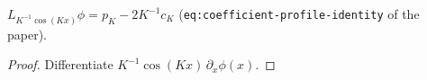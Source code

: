 \begin{lemma}
  \label{lem:coefficient-profile}
  \leanok
  $L_{K^{-1}\cos(Kx)}\phi=p_K-2K^{-1}c_K$
  (\texttt{eq:coefficient-profile-identity} of the paper).
\end{lemma}

\begin{proof}
  \leanok
  Differentiate $K^{-1}\cos(Kx)\,\partial_x\phi(x)$.
\end{proof}
